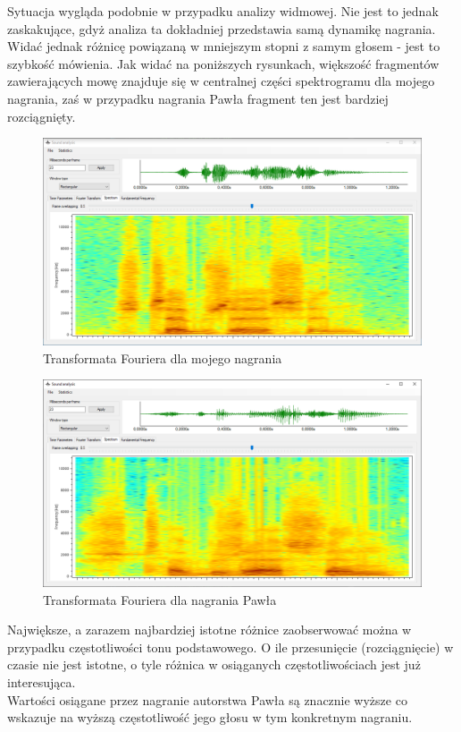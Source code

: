 \documentclass[a4paper]{article}
\begin{document}
Sytuacja wygląda podobnie w przypadku analizy widmowej. Nie jest to jednak zaskakujące, gdyż analiza ta dokładniej przedstawia samą dynamikę nagrania.\\
Widać jednak różnicę powiązaną w mniejszym stopni z samym głosem - jest to szybkość mówienia. Jak widać na poniższych rysunkach, większość fragmentów zawierających mowę znajduje się w centralnej części spektrogramu dla mojego nagrania, zaś w przypadku nagrania Pawła fragment ten jest bardziej rozciągnięty.
\begin{figure}[H]
  \centering
  \includegraphics[width=0.86\linewidth]{images/12spectrogramMy.png}
  \caption{Transformata Fouriera dla mojego nagrania}
\end{figure}
\begin{figure}[H]
  \centering
  \includegraphics[width=0.86\linewidth]{images/13spectrogramBro.png}
  \caption{Transformata Fouriera dla nagrania Pawła}
\end{figure}
Największe, a zarazem najbardziej istotne różnice zaobserwować można w przypadku częstotliwości tonu podstawowego. O ile przesunięcie (rozciągnięcie) w czasie nie jest istotne, o tyle różnica w osiąganych częstotliwościach jest już interesująca.\\
Wartości osiągane przez nagranie autorstwa Pawła są znacznie wyższe co wskazuje na wyższą częstotliwość jego głosu w tym konkretnym nagraniu.\\
\end{document}
